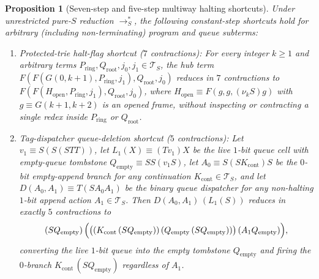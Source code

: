 \documentclass[11pt,reqno]{amsart}
\numberwithin{equation}{section}
\theoremstyle{plain}
\newtheorem{proposition}[theorem]{Proposition}
\theoremstyle{definition}
\theoremstyle{remark}
\newcommand{\TS}{\mathcal{T}_S}
\newcommand{\redSs}{\to_S^*}
\begin{document}
\begin{proposition}[Seven-step and five-step multiway halting shortcuts]\label{prop:multiway-shortcuts}
Under unrestricted pure-$S$ reduction $\redSs$, the following constant-step shortcuts hold for arbitrary (including non-terminating) program and queue subterms:
\begin{enumerate}[label=(\roman*),leftmargin=2.2em]
  \item \emph{Protected-trie halt-flag shortcut ($7$ contractions):} For every integer $k \ge 1$ and arbitrary terms $P_{\mathrm{ring}}, Q_{\mathrm{root}}, j_0, j_1 \in \TS$, the hub term $F(F(G(0, k+1), P_{\mathrm{ring}}, j_1), Q_{\mathrm{root}}, j_0)$ reduces in $7$ contractions to $F(F(H_{\mathrm{open}}, P_{\mathrm{ring}}, j_1), Q_{\mathrm{root}}, j_0)$, where $H_{\mathrm{open}} \equiv F(g, g, (\nu_k S) g)$ with $g \equiv G(k+1, k+2)$ is an opened frame, without inspecting or contracting a single redex inside $P_{\mathrm{ring}}$ or $Q_{\mathrm{root}}$.
  \item \emph{Tag-dispatcher queue-deletion shortcut ($5$ contractions):} Let $v_1 \equiv S(S(S T T))$, let $L_1(X) \equiv (T v_1) X$ be the live $1$-bit queue cell with empty-queue tombstone $Q_{\mathrm{empty}} \equiv S S (v_1 S)$, let $A_0 \equiv S(S K_{\mathrm{cont}}) S$ be the $0$-bit empty-append branch for any continuation $K_{\mathrm{cont}} \in \TS$, and let $D(A_0, A_1) \equiv T(S A_0 A_1)$ be the binary queue dispatcher for any non-halting $1$-bit append action $A_1 \in \TS$. Then $D(A_0, A_1)\,(L_1(S))$ reduces in exactly $5$ contractions to
  \[
    (S Q_{\mathrm{empty}})\,\Bigl(\bigl((K_{\mathrm{cont}}\,(S Q_{\mathrm{empty}}))\,(Q_{\mathrm{empty}}\,(S Q_{\mathrm{empty}}))\bigr)\,(A_1 Q_{\mathrm{empty}})\Bigr),
  \]
  converting the live $1$-bit queue into the empty tombstone $Q_{\mathrm{empty}}$ and firing the $0$-branch $K_{\mathrm{cont}}\,(S Q_{\mathrm{empty}})$ regardless of $A_1$.
\end{enumerate}
\end{proposition}
\end{document}
